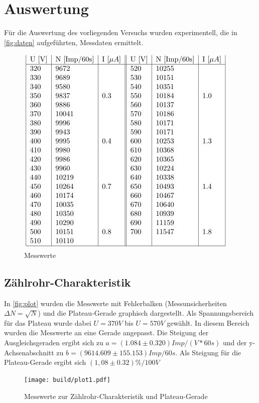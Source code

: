 \section{Auswertung}
\label{sec:Auswertung}
Für die Auswertung des vorliegenden Versuchs wurden experimentell, die in \autoref{fig:daten} aufgeführten, Messdaten ermittelt.

\begin{figure}
  \centering
  \includegraphics{content/daten.JPG}
  \caption{Messwerte \cite{sample}}
  \label{fig:daten}
\end{figure}

\subsection{Zählrohr-Charakteristik}
In \autoref{fig:plot} wurden die Messwerte mit Fehlerbalken (Messunsicherheiten $\Delta N = \sqrt{N}$) und die Plateau-Gerade graphisch dargestellt. Als Spannungsbereich für das Plateau wurde dabei $U=370V$ bis $U=570V$ gewählt. In diesem Bereich wurden die Messwerte an eine Gerade angepasst. Die Steigung der Ausgleichsgeraden ergibt sich zu $a=(1.084 \pm 0.320) Imp/(V*60s)$ und der y-Achsenabschnitt zu $b=(9614.609 \pm 155.153) Imp/60s$. Als Steigung für die Plateau-Gerade ergibt sich $(1,08 \pm 0.32) \%/100V$
\begin{figure}
  \centering
  \texttt{[image: build/plot1.pdf]}
  \caption{Messwerte zur Zählrohr-Charakteristik und Plateau-Gerade}
  \label{fig:plot}
\end{figure}



